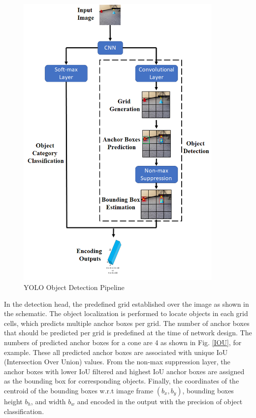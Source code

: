 \begin{figure}
    \centering
    \includegraphics[width=0.9\textwidth]{Images/YOLO.png}
    \caption{YOLO Object Detection Pipeline}
    \label{YOLO}
\end{figure} 

In the detection head, the predefined grid established over the image as shown in the schematic. The object localization is performed to locate objects in each grid cells, which predicts multiple anchor boxes per grid. The number of anchor boxes that should be predicted per grid is predefined at the time of network design. The numbers of predicted anchor boxes for a cone are 4 as shown in Fig. \ref{IOU}, for example. These all predicted anchor boxes are associated with unique IoU (Intersection Over Union) values. From the non-max suppression layer, the anchor boxes with lower IoU filtered and highest IoU anchor boxes are assigned as the bounding box for corresponding objects. Finally, the coordinates of the centroid of the bounding boxes w.r.t image frame $(b_x,b_y)$, bounding boxes height $b_h$, and width $b_w$ and encoded in the output with the precision of object classification.

